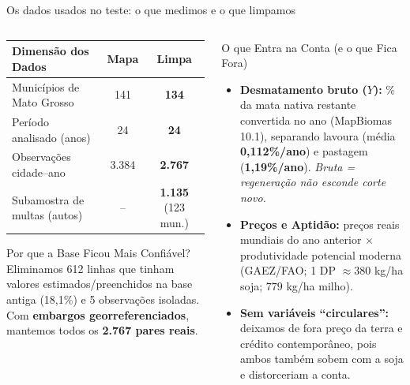 \documentclass[aspectratio=169,10.5pt]{beamer}
\newcommand{\fonte}[1]{\par\vspace{1mm}{\fontsize{6.5}{7.5}\selectfont\color{gray}Fonte: #1\par}}
\begin{document}
\begin{frame}{Os dados usados no teste: o que medimos e o que limpamos}
\begin{columns}[T]
\begin{column}{0.48\textwidth}
\fontsize{8}{9.6}\selectfont
\begin{tabularx}{\textwidth}{L c c}
\toprule
\textbf{Dimensão dos Dados} & \textbf{Mapa} & \textbf{Limpa}\\
\midrule
Municípios de Mato Grosso & 141 & \textbf{134}\\
Período analisado (anos) & 24 & \textbf{24}\\
Observações cidade--ano & 3.384 & \textbf{2.767}\\
Subamostra de multas (autos) & -- & \textbf{1.135} (123 mun.)\\
\bottomrule
\end{tabularx}
\vspace{2mm}
\begin{block}{Por que a Base Ficou Mais Confiável?}
\fontsize{7.8}{9.4}\selectfont
Eliminamos 612 linhas que tinham valores estimados/preenchidos na base antiga (18,1\%) e 5 observações isoladas. Com \textbf{embargos georreferenciados}, mantemos todos os \textbf{2.767 pares reais}.
\end{block}
\end{column}

\begin{column}{0.49\textwidth}
\begin{block}{O que Entra na Conta (e o que Fica Fora)}
\fontsize{7.8}{9.4}\selectfont
\begin{itemize}
    \setlength{\itemsep}{0.95mm}
    \item \textbf{Desmatamento bruto ($Y$):} \% da mata nativa restante convertida no ano (MapBiomas 10.1), separando lavoura (média \textbf{0,112\%/ano}) e pastagem (\textbf{1,19\%/ano}). \textit{Bruta = regeneração não esconde corte novo.}
    \item \textbf{Preços e Aptidão:} preços reais mundiais do ano anterior $\times$ produtividade potencial moderna (GAEZ/FAO; 1 DP $\approx 380$ kg/ha soja; $779$ kg/ha milho).
    \item \textbf{Sem variáveis ``circulares'':} deixamos de fora preço da terra e crédito contemporâneo, pois ambos também sobem com a soja e distorceriam a conta.
\end{itemize}
\end{block}
\end{column}
\end{columns}
\end{frame}
\end{document}
